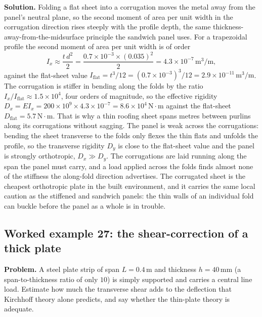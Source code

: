 \textbf{Solution.} Folding a flat sheet into a corrugation moves the metal
away from the panel's neutral plane, so the second moment of area per unit
width in the corrugation direction rises steeply with the profile depth,
the same thickness-away-from-the-midsurface principle the sandwich panel
uses. For a trapezoidal profile the second moment of area per unit width is
of order
\[
I_x \approx \frac{t\,d^2}{2}
= \frac{0.7\times 10^{-3}\times (0.035)^2}{2}
= 4.3\times 10^{-7}\,\text{m}^3/\text{m},
\]
against the flat-sheet value $I_{\text{flat}} = t^3/12 = (0.7\times
10^{-3})^3/12 = 2.9\times 10^{-11}\,\text{m}^3/\text{m}$. The corrugation
is stiffer in bending along the folds by the ratio $I_x/I_{\text{flat}}
\approx 1.5\times 10^4$, four orders of magnitude, so the effective rigidity
$D_x = E I_x = 200\times 10^9\times 4.3\times 10^{-7} = 8.6\times 10^{4}\,
\text{N}\cdot\text{m}$ against the flat-sheet $D_{\text{flat}} = 5.7\,
\text{N}\cdot\text{m}$. That is why a thin roofing sheet spans metres
between purlins along its corrugations without sagging. The panel is weak
across the corrugations: bending the sheet transverse to the folds only
flexes the thin flats and unfolds the profile, so the transverse rigidity
$D_y$ is close to the flat-sheet value and the panel is strongly
orthotropic, $D_x \gg D_y$. The corrugations are laid running along the
span the panel must carry, and a load applied across the folds finds almost
none of the stiffness the along-fold direction advertises. The corrugated
sheet is the cheapest orthotropic plate in the built environment, and it
carries the same local caution as the stiffened and sandwich panels: the
thin walls of an individual fold can buckle before the panel as a whole is
in trouble.

\subsection*{Worked example 27: the shear-correction of a thick plate}

\textbf{Problem.} A steel plate strip of span $L = 0.4\,\si{\meter}$ and
thickness $h = 40\,\si{\milli\meter}$ (a span-to-thickness ratio of only
$10$) is simply supported and carries a central line load. Estimate how
much the transverse shear adds to the deflection that Kirchhoff theory
alone predicts, and say whether the thin-plate theory is adequate.

